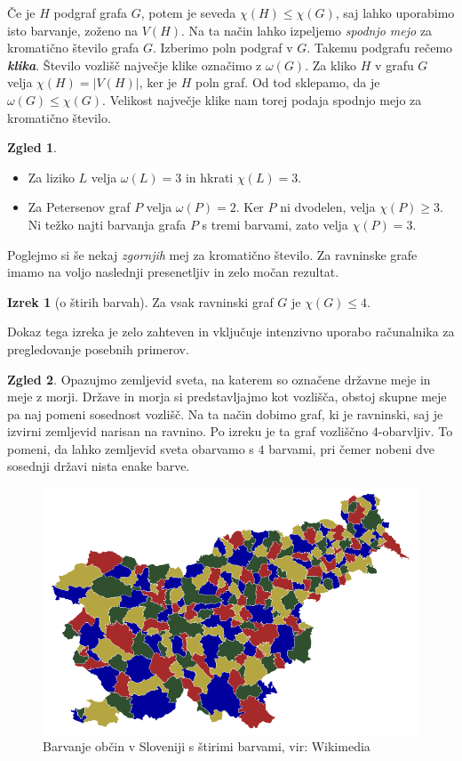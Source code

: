 \documentclass[11pt]{book}
\def\definicija{\color{rdeca}\bf\em}
\theoremstyle{definition}
\theoremstyle{zgled}
\newtheorem*{zgled}{Zgled}
\theoremstyle{odprtproblem}
\theoremstyle{domacanaloga}
\theoremstyle{izrek}
\newtheorem*{izrek}{Izrek}
\begin{document}
Če je $H$ podgraf grafa $G$, potem je seveda $\chi(H) \leq \chi(G)$, saj lahko uporabimo isto barvanje, zoženo na $V(H)$. Na ta način lahko izpeljemo \emph{spodnjo mejo} za kromatično število grafa $G$. Izberimo poln podgraf v $G$. Takemu podgrafu rečemo {\definicija klika}. Število vozlišč največje klike označimo z $\omega(G)$. Za kliko $H$ v grafu $G$ velja $\chi(H) = |V(H)|$, ker je $H$ poln graf. Od tod sklepamo, da je $\omega(G) \leq \chi(G)$. Velikost največje klike nam torej podaja spodnjo mejo za kromatično število.

\begin{zgled} \leavevmode
\begin{itemize}
\item Za liziko $L$ velja $\omega(L) = 3$ in hkrati $\chi(L) = 3$.
\item Za Petersenov graf $P$ velja $\omega(P) = 2$. Ker $P$ ni dvodelen, velja $\chi(P) \geq 3$. Ni težko najti barvanja grafa $P$ s tremi barvami, zato velja $\chi(P) = 3$.
\end{itemize}
\end{zgled}

Poglejmo si še nekaj \emph{zgornjih} mej za kromatično število. Za ravninske grafe imamo na voljo naslednji presenetljiv in zelo močan rezultat.

\begin{izrek}[o štirih barvah]
Za vsak ravninski graf $G$ je $\chi(G) \leq 4$.
\end{izrek}

Dokaz tega izreka je zelo zahteven in vključuje intenzivno uporabo računalnika za pregledovanje posebnih primerov.

\begin{zgled}
Opazujmo zemljevid sveta, na katerem so označene državne meje in meje z morji. Države in morja si predstavljajmo kot vozlišča, obstoj skupne meje pa naj pomeni sosednost vozlišč. Na ta način dobimo graf, ki je ravninski, saj je izvirni zemljevid narisan na ravnino. Po izreku je ta graf vozliščno $4$-obarvljiv. To pomeni, da lahko zemljevid sveta obarvamo s $4$ barvami, pri čemer nobeni dve sosednji državi nista enake barve.

\begin{figure}[h]
    \centering
    \includegraphics[width=0.5\linewidth]{img/obcine.png}
    \caption{Barvanje občin v Sloveniji s štirimi barvami, vir: Wikimedia}
\end{figure}
\end{zgled}
\end{document}
